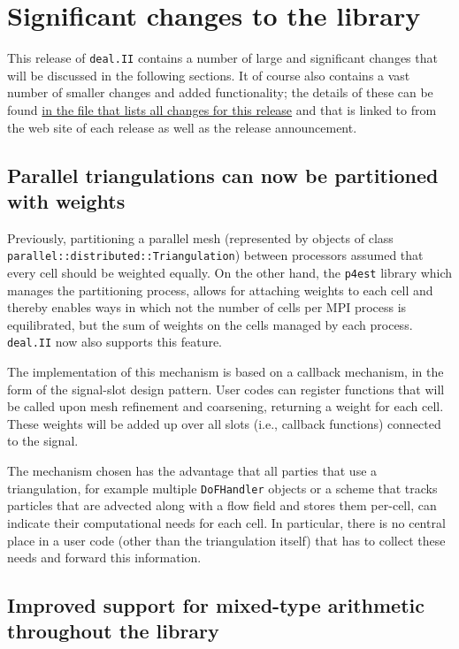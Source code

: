 \documentclass{ansarticle-preprint}
\newcommand{\specialword}[1]{\texttt{#1}}
\newcommand{\dealii}{{\specialword{deal.II}}}
\newcommand{\pfrst}{{\specialword{p4est}}}
\begin{document}
\section{Significant changes to the library}

This release of \dealii{} contains a number of large and significant changes
that will be discussed in the following sections. It of course also contains a
vast number of smaller changes and added functionality; the details of these
can be found
\href{https://www.dealii.org/8.4.0/doxygen/deal.II/changes_between_8_3_0_and_8_4.html}{in the file that lists all changes for this release}
and that is linked to from the web site of each release as well as the
release announcement.


\subsection{Parallel triangulations can now be partitioned with weights}

Previously, partitioning a parallel mesh (represented by objects of class
\texttt{parallel::}\-\texttt{distributed::}\-\texttt{Triangulation}) between
processors assumed that every cell should be weighted equally. On the
other hand, the \pfrst{} library which manages the partitioning
process, allows for attaching weights to each cell and thereby
enables ways in which not the number of cells per MPI process is
equilibrated, but the sum of weights on the cells managed by each
process. \dealii{} now also supports this feature.

The implementation of this mechanism is based on a callback mechanism,
in the form of the signal-slot design pattern. User codes can register
functions that will be called upon mesh refinement and coarsening,
returning a weight for each cell. These weights will be added up over
all slots (i.e., callback functions) connected to the signal.

The mechanism chosen has the advantage that all parties that use a
triangulation, for example multiple \texttt{DoFHandler} objects or a
scheme that tracks particles that are advected along with a flow field
and stores them per-cell, can indicate their computational needs for
each cell. In particular, there is no central place in a user code (other than
the 
triangulation itself) that has to collect these needs and forward this
information.


\subsection{Improved support for mixed-type arithmetic throughout the
  library}
\end{document}
